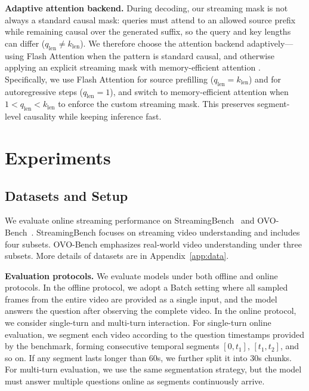 \documentclass{article}
\begin{document}
\noindent\textbf{Adaptive attention backend.}
During decoding, our streaming mask is not always a standard causal mask: queries must attend to an allowed source prefix while remaining causal over the generated suffix, so the query and key lengths can differ ($q_{\text{len}} \neq k_{\text{len}}$). We therefore choose the attention backend adaptively---using Flash Attention \cite{dao2022flashattentionfastmemoryefficientexact} when the pattern is standard causal, and otherwise applying an explicit streaming mask with memory-efficient attention \cite{rabe2022selfattentiondoesneedon2}. Specifically, we use Flash Attention for source prefilling ($q_{\text{len}} = k_{\text{len}}$) and for autoregressive steps ($q_{\text{len}} = 1$), and switch to memory-efficient attention when $1 < q_{\text{len}} < k_{\text{len}}$ to enforce the custom streaming mask. This preserves segment-level causality while keeping inference fast.

\section{Experiments}
\label{sec:experiments}

\subsection{Datasets and Setup}
\label{sec:exp_setup}

We evaluate online streaming performance on StreamingBench~\cite{lin2024streamingbenchassessinggapmllms} and OVO-Bench~\cite{DBLP:conf/cvpr/NiuLMGZHDDD0ZZC25}. StreamingBench focuses on streaming video understanding and includes four subsets. OVO-Bench emphasizes real-world video understanding under three subsets. More details of datasets are in Appendix~\ref{app:data}.

\noindent\textbf{Evaluation protocols.}
We evaluate models under both offline and online protocols. In the offline protocol, we adopt a Batch setting where all sampled frames from the entire video are provided as a single input, and the model answers the question after observing the complete video. In the online protocol, we consider single-turn and multi-turn interaction. For single-turn online evaluation, we segment each video according to the question timestamps provided by the benchmark, forming consecutive temporal segments $[0,t_1]$, $[t_1,t_2]$, and so on. If any segment lasts longer than $60$s, we further split it into $30$s chunks. For multi-turn evaluation, we use the same segmentation strategy, but the model must answer multiple questions online as segments continuously arrive.
\end{document}
